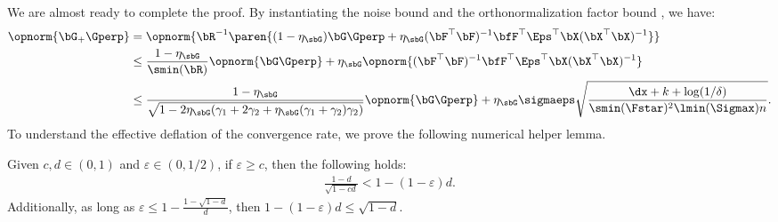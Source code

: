We are almost ready to complete the proof. By instantiating the noise bound  and the orthonormalization factor bound , we have:
\begin{align*}
    \opnorm{\bG_+ \Gperp} &= \opnorm{\bR^{-1}\paren{(1 - \eta_\sbG) \bG \Gperp + \eta_\sbG (\bF^\top \bF)^{-1}\bfF^\top \Eps^\top \bX (\bX^\top \bX)^{-1}}} \\
    &\leq \frac{1-\eta_\sbG}{\smin(\bR)} \opnorm{\bG \Gperp} + \eta_\sbG \opnorm{(\bF^\top \bF)^{-1}\bfF^\top \Eps^\top \bX (\bX^\top \bX)^{-1}} \\
    &\leq \frac{1-\eta_\sbG}{\sqrt{1 - 2\eta_\sbG(\gamma_1 + 2\gamma_2 + \eta_\sbG(\gamma_1 + \gamma_2)\gamma_2)}}\opnorm{\bG \Gperp} + \eta_\sbG \sigmaeps  \sqrt{\frac{\dx + k + \log(1/\delta)}{\smin(\Fstar)^2\lmin(\Sigmax) n}}.
\end{align*}
To understand the effective deflation of the convergence rate, we prove the following numerical helper lemma.
\begin{lemma}\label{lem: avoiding square root rate}
    Given $c, d \in (0,1)$ and $\varepsilon \in (0,1/2)$, if $\varepsilon \geq c$, then the following holds:
    \begin{align*}
        \frac{1 - d}{\sqrt{1 - c d}} < 1 - (1 - \varepsilon) d.
    \end{align*}
    Additionally, as long as $\varepsilon \leq 1-\frac{1-\sqrt{1-d}}{d}$, then $1 - (1-\varepsilon) d \leq \sqrt{1 - d}$.
\end{lemma}

